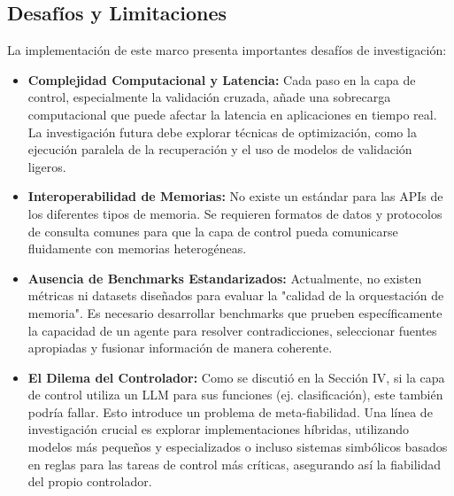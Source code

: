 \documentclass[journal,onecolumn]{IEEEtran}
\begin{document}
\subsection{Desafíos y Limitaciones}
La implementación de este marco presenta importantes desafíos de investigación:
\begin{itemize}
    \item \textbf{Complejidad Computacional y Latencia:} Cada paso en la capa de control, especialmente la validación cruzada, añade una sobrecarga computacional que puede afectar la latencia en aplicaciones en tiempo real. La investigación futura debe explorar técnicas de optimización, como la ejecución paralela de la recuperación y el uso de modelos de validación ligeros.
    \item \textbf{Interoperabilidad de Memorias:} No existe un estándar para las APIs de los diferentes tipos de memoria. Se requieren formatos de datos y protocolos de consulta comunes para que la capa de control pueda comunicarse fluidamente con memorias heterogéneas.
    \item \textbf{Ausencia de Benchmarks Estandarizados:} Actualmente, no existen métricas ni datasets diseñados para evaluar la "calidad de la orquestación de memoria". Es necesario desarrollar benchmarks que prueben específicamente la capacidad de un agente para resolver contradicciones, seleccionar fuentes apropiadas y fusionar información de manera coherente.
    \item \textbf{El Dilema del Controlador:} Como se discutió en la Sección IV, si la capa de control utiliza un LLM para sus funciones (ej. clasificación), este también podría fallar. Esto introduce un problema de meta-fiabilidad. Una línea de investigación crucial es explorar implementaciones híbridas, utilizando modelos más pequeños y especializados o incluso sistemas simbólicos basados en reglas para las tareas de control más críticas, asegurando así la fiabilidad del propio controlador.
\end{itemize}
\end{document}
